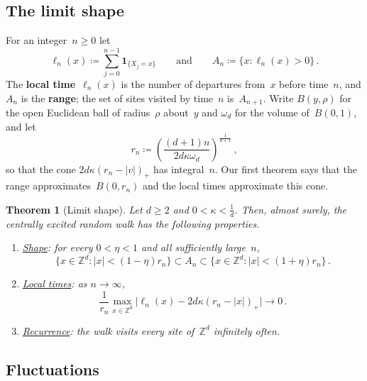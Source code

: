 \documentclass[11pt]{amsart}
\theoremstyle{plain}
\newtheorem{theorem}{Theorem}[section]
\theoremstyle{definition}
\newcommand{\Z}{\mathbb Z}
\newcommand{\drift}{\kappa}
\newcommand{\ind}{\mathbf 1}
\newcommand{\defn}[1]{\textbf{#1}}
\numberwithin{equation}{section}
\begin{document}
\subsection{The limit shape}\label{sec:shape}

For an integer~$n\geq0$ let
\begin{equation*}
\ell_n(x)\coloneqq\sum_{j=0}^{n-1}\ind_{\{X_j=x\}}
\qquad\text{and}\qquad
A_n\coloneqq\{x:\ell_n(x)>0\}\, .
\end{equation*}
The \defn{local time}~$\ell_n(x)$ is the number of departures from~$x$ before time~$n$, and $A_n$ is the \defn{range}; the set of sites visited by time~$n$ is~$A_{n+1}$. Write $B(y,\rho)$ for the open Euclidean ball of radius~$\rho$ about~$y$ and $\omega_d$ for the volume of~$B(0,1)$, and let
\begin{equation}\label{eq:radius}
r_n\coloneqq\left(\frac{(d+1)n}{2d\drift\omega_d}\right)^{\frac{1}{d+1}}\, ,
\end{equation}
so that the cone $2d\drift(r_n-|v|)_+$ has integral~$n$. Our first theorem says that the range approximates~$B(0,r_n)$ and the local times approximate this cone. 

\begin{theorem}[Limit shape]\label{thm:shape}
Let $d\geq2$ and $0<\drift< \frac1d$. Then, almost surely, the centrally excited random walk has the following properties.
\begin{enumerate}[label=\textup{(\roman*)}]
\item \underline{\emph{Shape}}: for every $0<\eta<1$ and all sufficiently large~$n$,
\begin{equation*}
\{x\in\Z^d:|x|<(1-\eta)r_n\}\subset A_n\subset\{x\in\Z^d:|x|<(1+\eta)r_n\}\, .
\end{equation*}
\item \underline{\emph{Local times}}: as $n\to\infty$,
\begin{equation*}
\frac1{r_n}\max_{x\in\Z^d}\bigl|\ell_n(x)-2d\drift(r_n-|x|)_+\bigr|\longrightarrow0\, .
\end{equation*}
\item \underline{\emph{Recurrence}}: the walk visits every site of~$\Z^d$ infinitely often.
\end{enumerate}
\end{theorem}

\subsection{Fluctuations}\label{sec:fluct-intro}
\end{document}

